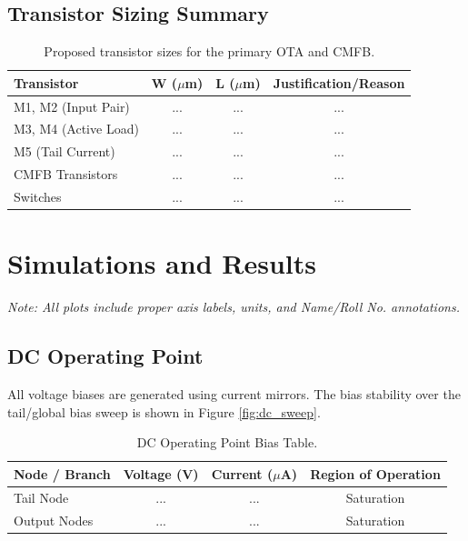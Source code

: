 \documentclass[12pt, a4paper]{article}
\begin{document}
\subsection{Transistor Sizing Summary}
\begin{table}[H]
    \centering
    \begin{tabular}{@{} l c c c @{}}
        \toprule
        \textbf{Transistor} & \textbf{W ($\mu$m)} & \textbf{L ($\mu$m)} & \textbf{Justification/Reason} \\
        \midrule
        M1, M2 (Input Pair) & ... & ... & ... \\
        M3, M4 (Active Load)& ... & ... & ... \\
        M5 (Tail Current)   & ... & ... & ... \\
        CMFB Transistors    & ... & ... & ... \\
        Switches            & ... & ... & ... \\
        \bottomrule
    \end{tabular}
    \caption{Proposed transistor sizes for the primary OTA and CMFB.}
\end{table}

\section{Simulations and Results}
\textit{Note: All plots include proper axis labels, units, and Name/Roll No. annotations.}

\subsection{DC Operating Point}
All voltage biases are generated using current mirrors. The bias stability over the tail/global bias sweep is shown in Figure \ref{fig:dc_sweep}.

\begin{table}[H]
    \centering
    \begin{tabular}{@{} l c c c @{}}
        \toprule
        \textbf{Node / Branch} & \textbf{Voltage (V)} & \textbf{Current ($\mu$A)} & \textbf{Region of Operation} \\
        \midrule
        Tail Node & ... & ... & Saturation \\
        Output Nodes & ... & ... & Saturation \\
        \bottomrule
    \end{tabular}
    \caption{DC Operating Point Bias Table.}
\end{table}
\end{document}
